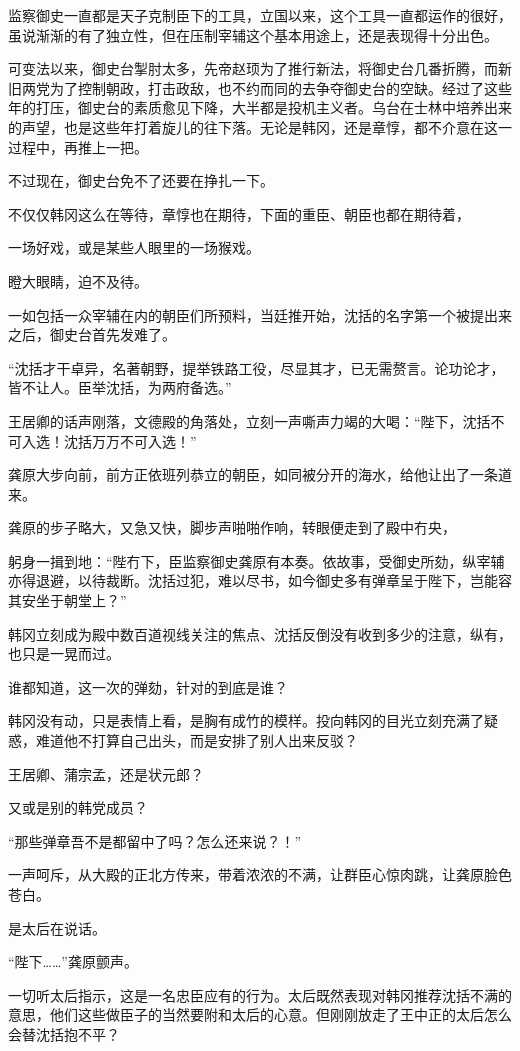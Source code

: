 监察御史一直都是天子克制臣下的工具，立国以来，这个工具一直都运作的很好，虽说渐渐的有了独立性，但在压制宰辅这个基本用途上，还是表现得十分出色。

可变法以来，御史台掣肘太多，先帝赵顼为了推行新法，将御史台几番折腾，而新旧两党为了控制朝政，打击政敌，也不约而同的去争夺御史台的空缺。经过了这些年的打压，御史台的素质愈见下降，大半都是投机主义者。乌台在士林中培养出来的声望，也是这些年打着旋儿的往下落。无论是韩冈，还是章惇，都不介意在这一过程中，再推上一把。

不过现在，御史台免不了还要在挣扎一下。

不仅仅韩冈这么在等待，章惇也在期待，下面的重臣、朝臣也都在期待着，

一场好戏，或是某些人眼里的一场猴戏。

瞪大眼睛，迫不及待。

一如包括一众宰辅在内的朝臣们所预料，当廷推开始，沈括的名字第一个被提出来之后，御史台首先发难了。

“沈括才干卓异，名著朝野，提举铁路工役，尽显其才，已无需赘言。论功论才，皆不让人。臣举沈括，为两府备选。”

王居卿的话声刚落，文德殿的角落处，立刻一声嘶声力竭的大喝：“陛下，沈括不可入选！沈括万万不可入选！”

龚原大步向前，前方正依班列恭立的朝臣，如同被分开的海水，给他让出了一条道来。

龚原的步子略大，又急又快，脚步声啪啪作响，转眼便走到了殿中冇央，

躬身一揖到地：“陛冇下，臣监察御史龚原有本奏。依故事，受御史所劾，纵宰辅亦得退避，以待裁断。沈括过犯，难以尽书，如今御史多有弹章呈于陛下，岂能容其安坐于朝堂上？”

韩冈立刻成为殿中数百道视线关注的焦点、沈括反倒没有收到多少的注意，纵有，也只是一晃而过。

谁都知道，这一次的弹劾，针对的到底是谁？

韩冈没有动，只是表情上看，是胸有成竹的模样。投向韩冈的目光立刻充满了疑惑，难道他不打算自己出头，而是安排了别人出来反驳？

王居卿、蒲宗孟，还是状元郎？

又或是别的韩党成员？

“那些弹章吾不是都留中了吗？怎么还来说？！”

一声呵斥，从大殿的正北方传来，带着浓浓的不满，让群臣心惊肉跳，让龚原脸色苍白。

是太后在说话。

“陛下……”龚原颤声。

一切听太后指示，这是一名忠臣应有的行为。太后既然表现对韩冈推荐沈括不满的意思，他们这些做臣子的当然要附和太后的心意。但刚刚放走了王中正的太后怎么会替沈括抱不平？

